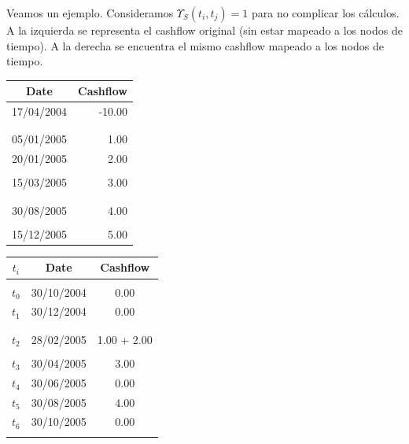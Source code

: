 Veamos un ejemplo. Consideramos $\Upsilon_S(t_i,t_j)=1$ para no complicar los c\'alculos.
A la izquierda se representa el cashflow original (sin estar mapeado a los nodos de
tiempo). A la derecha se encuentra el mismo cashflow mapeado a los nodos de tiempo.
\newline
\newline
\begin{minipage}[c]{0.5\columnwidth}%
\centering
\begin{tabular}{c|r}
\textbf{Date} & \textbf{Cashflow} \\
\hline
17/04/2004 & -10.00 \\
           &        \\
           &        \\
05/01/2005 &   1.00 \\
20/01/2005 &   2.00 \\
           &        \\
15/03/2005 &   3.00 \\
           &        \\
           &        \\
30/08/2005 &   4.00 \\
           &        \\
15/12/2005 &   5.00 \\
\end{tabular}
\end{minipage}%
\begin{minipage}[c]{0.5\columnwidth}%
\centering
\begin{tabular}{c|c|c}
\textbf{$t_i$} & \textbf{Date}  & \textbf{Cashflow} \\
\hline
      &            &      \\
$t_0$ & 30/10/2004 & 0.00 \\
$t_1$ & 30/12/2004 & 0.00 \\
      &            &      \\
      &            &      \\
$t_2$ & 28/02/2005 & 1.00 + 2.00 \\
      &            &      \\
$t_3$ & 30/04/2005 & 3.00 \\
$t_4$ & 30/06/2005 & 0.00 \\
$t_5$ & 30/08/2005 & 4.00 \\
$t_6$ & 30/10/2005 & 0.00 \\
      &            &      \\
\end{tabular}
\end{minipage}%

